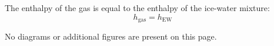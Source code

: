 The enthalpy of the gas is equal to the enthalpy of the ice-water mixture:  
\[
h_{\text{gas}} = h_{\text{EW}}
\]  

No diagrams or additional figures are present on this page.